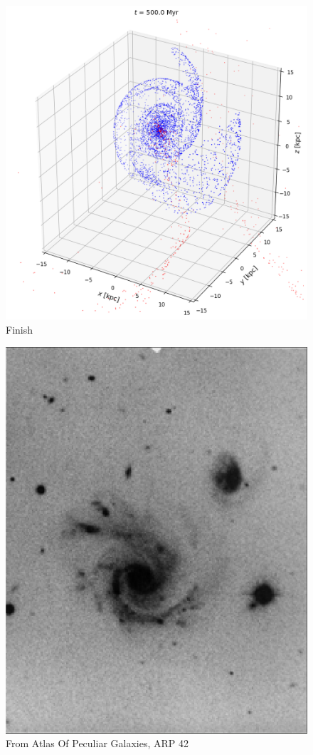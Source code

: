 \documentclass[linenumbers,RNAAS,trackchanges]{aastex631}
\begin{document}
\begin{figure}[H]
    \centering
    \includegraphics[scale=.40]{comparison_galaxy/ARP_42_output.png}
    \caption{Finish}
    \label{fig:code}
\end{figure}
\begin{figure}[H]
    \centering
    \includegraphics[scale=.50]{comparison_galaxy/arp_42.png}
    \caption{From Atlas Of Peculiar Galaxies, ARP 42}
    \label{fig:code}
\end{figure}
\end{document}
